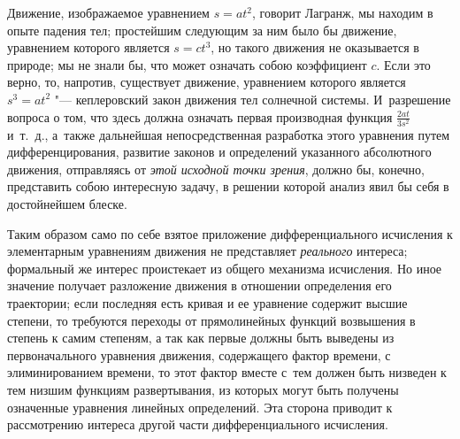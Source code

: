 Движение, изображаемое уравнением $s=at^2$, говорит Лагранж, мы находим в опыте
падения тел; простейшим следующим за ним было бы движение, уравнением которого
является $s=ct^3$, но такого движения не оказывается в природе; мы не знали бы,
что может означать собою коэффициент $c$. Если это верно, то, напротив,
существует движение, уравнением которого является $s^3=at^2$ "--- кеплеровский
закон движения тел солнечной системы. И~разрешение вопроса о том, что здесь
должна означать первая производная функция $\frac{2at}{3s^2}$ и~т.~д., а~также
дальнейшая непосредственная разработка этого уравнения путем дифференцирования,
развитие законов и определений указанного абсолютного движения, отправляясь от
{\em этой исходной точки зрения}, должно бы, конечно, представить собою
интересную задачу, в решении которой анализ явил бы себя в достойнейшем блеске.

Таким образом само по себе взятое приложение дифференциального исчисления
к элементарным уравнениям движения не представляет {\em реального} интереса;
формальный же интерес проистекает из общего механизма исчисления. Но иное
значение получает разложение движения в отношении определения его траектории;
если последняя есть кривая и ее уравнение содержит высшие степени, то требуются
переходы от прямолинейных функций возвышения в степень к самим степеням, а так
как первые должны быть выведены из первоначального уравнения движения,
содержащего фактор времени, с элиминированием времени, то этот фактор вместе
с~тем должен быть низведен к тем низшим функциям развертывания, из которых
могут быть получены означенные уравнения линейных определений. Эта сторона
приводит к рассмотрению интереса другой части дифференциального исчисления.

